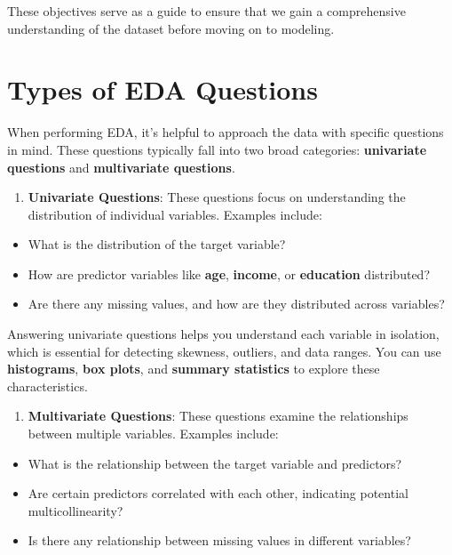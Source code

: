 \documentclass[
]{book}
\providecommand{\tightlist}{%
  \setlength{\itemsep}{0pt}\setlength{\parskip}{0pt}}
\theoremstyle{definition}
\theoremstyle{definition}
\theoremstyle{definition}
\theoremstyle{definition}
\theoremstyle{remark}
\begin{document}
These objectives serve as a guide to ensure that we gain a comprehensive understanding of the dataset before moving on to modeling.

\section{Types of EDA Questions}\label{types-of-eda-questions}

When performing EDA, it's helpful to approach the data with specific questions in mind. These questions typically fall into two broad categories: \textbf{univariate questions} and \textbf{multivariate questions}.

\begin{enumerate}
\def\labelenumi{\arabic{enumi}.}
\tightlist
\item
  \textbf{Univariate Questions}: These questions focus on understanding the distribution of individual variables. Examples include:
\end{enumerate}

\begin{itemize}
\tightlist
\item
  What is the distribution of the target variable?
\item
  How are predictor variables like \textbf{age}, \textbf{income}, or \textbf{education} distributed?
\item
  Are there any missing values, and how are they distributed across variables?
\end{itemize}

Answering univariate questions helps you understand each variable in isolation, which is essential for detecting skewness, outliers, and data ranges. You can use \textbf{histograms}, \textbf{box plots}, and \textbf{summary statistics} to explore these characteristics.

\begin{enumerate}
\def\labelenumi{\arabic{enumi}.}
\setcounter{enumi}{1}
\tightlist
\item
  \textbf{Multivariate Questions}: These questions examine the relationships between multiple variables. Examples include:
\end{enumerate}

\begin{itemize}
\tightlist
\item
  What is the relationship between the target variable and predictors?
\item
  Are certain predictors correlated with each other, indicating potential multicollinearity?
\item
  Is there any relationship between missing values in different variables?
\end{itemize}
\end{document}
